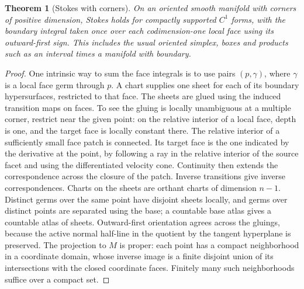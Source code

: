 \documentclass[11pt,oneside,openany]{book}
\newtheorem{theorem}{Theorem}[chapter]
\theoremstyle{definition}
\theoremstyle{remark}
\begin{document}
\begin{theorem}[Stokes with corners]
\label{p104:M10.06}
On an oriented smooth manifold with corners of positive dimension,
Stokes holds for compactly supported \(C^1\) forms, with the boundary
integral taken once over each codimension-one local face using its
outward-first sign. This includes the usual oriented simplex, boxes
and products such as an interval times a manifold with boundary.
\end{theorem}
\begin{proof}
One intrinsic way to sum the face integrals is to use pairs
\((p,\gamma)\), where \(\gamma\) is a local face germ through \(p\).
A chart supplies one sheet for each of its boundary hypersurfaces,
restricted to that face. The sheets are glued using the induced
transition maps on faces. To see the gluing is locally unambiguous
at a multiple corner, restrict near the given point: on the
relative interior of a local face, depth is one, and the target
face is locally constant there. The relative interior of a
sufficiently small face patch is connected. Its target face is the
one indicated by the derivative at the point, by following a ray
in the relative interior of the source facet and using the
differentiated velocity cone. Continuity then extends the
correspondence across the closure of the patch. Inverse
transitions give inverse correspondences. Charts on the sheets
are orthant charts of dimension \(n-1\). Distinct germs over the
same point have disjoint sheets locally, and germs over distinct
points are separated using the base; a countable base atlas gives
a countable atlas of sheets. Outward-first orientation agrees
across the gluings, because the active normal half-line in the
quotient by the tangent hyperplane is preserved. The projection
to \(M\) is proper: each point has a compact neighborhood in a
coordinate domain, whose inverse image is a finite disjoint
union of its intersections with the closed coordinate faces.
Finitely many such neighborhoods suffice over a compact set.


\end{proof}
\end{document}
